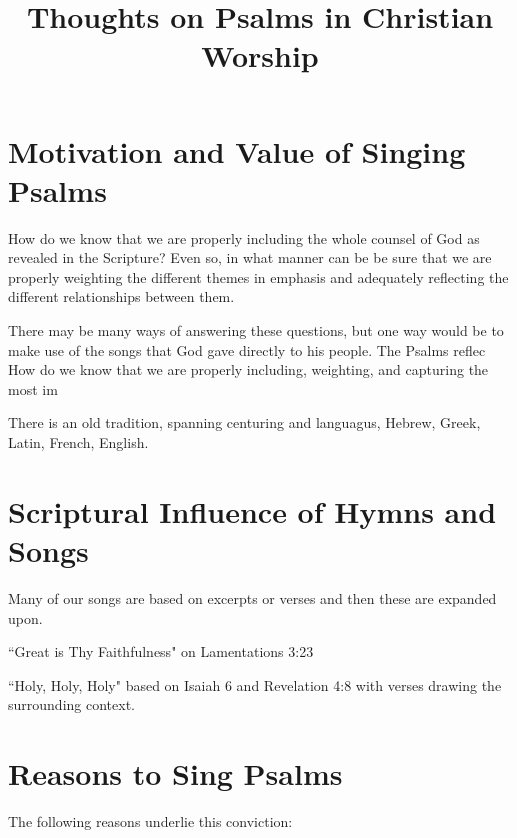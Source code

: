 \documentclass{article}
\title{Thoughts on Psalms in Christian Worship}
\begin{document}
\maketitle


\section{Motivation and Value of Singing Psalms}

How do we know that we are properly including the whole counsel of God as revealed in the Scripture? Even so, in what manner can be be sure that we are properly weighting the different themes in emphasis and adequately reflecting the different relationships between them.

There may be many ways of answering these questions, but one way would be to make use of the songs that God gave directly to his people.  The Psalms reflec 
How do we know that we are properly including, weighting, and capturing the most im

There is an old tradition, spanning centuring and languagus, Hebrew, Greek, Latin, French, English.

\section{Scriptural Influence of Hymns and Songs}

Many of our songs are based on excerpts or verses and then these are expanded upon.

``Great is Thy Faithfulness" on Lamentations 3:23

``Holy, Holy, Holy" based on Isaiah 6 and Revelation 4:8 with verses drawing the surrounding context. 
\section{Reasons to Sing Psalms}
The following reasons underlie this conviction:
\end{document}
